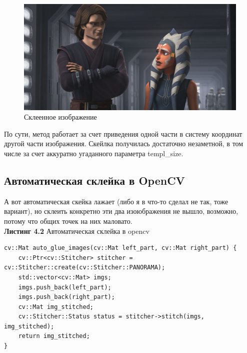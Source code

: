 \begin{figure}[h]
    \centering
   
    \includegraphics[scale=0.4]{../images/results/manually_glued_img.jpeg}
    \caption{Склеенное изображение}
\end{figure}
\noindent По сути, метод  работает за счет приведения одной части в систему координат другой части изображения. Скейлка получилась достаточно незаметной, в том числе за счет аккуратно угаданного параметра templ\_size.

\subsection{Автоматическая склейка в OpenCV}
\noindent А вот автоматическая скейка лажает (либо я в что-то сделал не так, тоже вариант), но склеить конкретно эти два изоюбражения не вышло, возможно, потому что общих точек на них маловато.
\\ \noindent \textbf{Листинг 4.2} Автоматическая склейка в opencv
\begin{lstlisting}
cv::Mat auto_glue_images(cv::Mat left_part, cv::Mat right_part) {
	cv::Ptr<cv::Stitcher> stitcher = cv::Stitcher::create(cv::Stitcher::PANORAMA);
	std::vector<cv::Mat> imgs;
	imgs.push_back(left_part);
	imgs.push_back(right_part);
	cv::Mat img_stitched;
	cv::Stitcher::Status status = stitcher->stitch(imgs, img_stitched);
	return img_stitched;
}

\end{lstlisting}

\newpage
